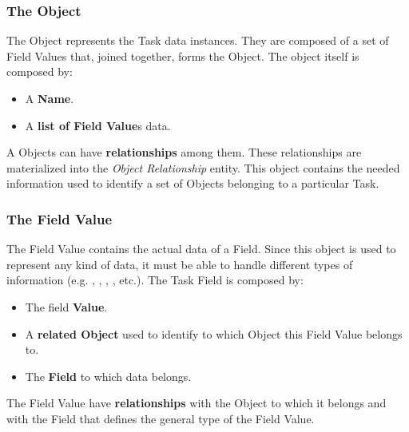 \subsubsection{The Object}
The Object represents the Task data instances. They are composed of a set of
Field Values that, joined together, forms the Object. The object itself is
composed by:
\begin{itemize}
    \item A \textbf{Name}.
    \item A \textbf{list of Field Value}s data.
\end{itemize}

A Objects can have \textbf{relationships} among them. These relationships are
materialized into the \emph{Object Relationship} entity. This object contains
the needed information used to identify a set of Objects belonging to a
particular Task.



\subsubsection{The Field Value}
The Field Value contains the actual data of a Field. Since this object is used
to represent any kind of data, it must be able to handle different types of
information (e.g. , , , , etc.).
The Task Field is composed by:
\begin{itemize}
    \item The field \textbf{Value}.
    \item A \textbf{related Object} used to identify to which Object this Field
    Value belongs to.
    \item The \textbf{Field} to which data belongs.
\end{itemize}

The Field Value have \textbf{relationships} with the Object to which it belongs
and with the Field that defines the general type of the Field Value.








